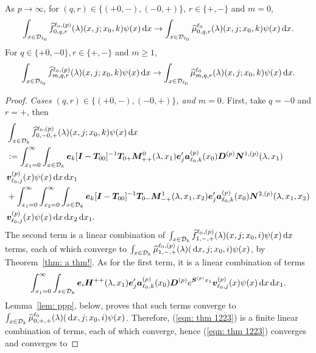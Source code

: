 \begin{thm}\label{thm: a thm2!}
	As \(p\to \infty\), for \((q,r)\in\{(+0,-),(-0,+)\},\, r\in\{+,-\}\) and \(m=0\),  
	\begin{align}\int_{x\in\mathcal{D}_{\ell_0}}\widehat f_{0,q,r}^{\ell_0,(p)}(\lambda)(x,j;x_0,k)\psi(x)\, \mathrm{d} x \to \int_{x\in\mathcal{D}_{\ell_0}}\widehat \mu_{0,q,r}^{\ell_0}(\lambda)(x,j;x_0,k)\psi(x)\, \mathrm{d} x.\end{align}
	For \(q\in\{+0,-0\}, r\in\{+,-\}\) and \(m\geq 1\), 
	\begin{align}\int_{x\in\mathcal{D}_{\ell_0}}\widehat f_{m,q,r}^{\ell_0,(p)}(\lambda)(x,j;x_0,k)\psi(x)\, \mathrm{d} x \to \int_{x\in\mathcal{D}_{\ell_0}}\widehat \mu_{m,q,r}^{\ell_0}(\lambda)(x,j;x_0,k)\psi(x)\, \mathrm{d} x.\label{eqn: thm 22}\end{align}
\end{thm}
\begin{proof}
	\textit{Cases \((q,r) \in \{(+0,-),(-0,+)\}\), and \(m=0\).} First, take \(q=-0\) and \(r=+\), then 
	\begin{align}
		&\int_{x\in\mathcal{D}_k}\widehat{f}_{0,-0,+}^{\ell_0,(p)}(\lambda)(x,j;x_0,k)\psi(x)\, \mathrm{d} x \nonumber 
		\\&:=\int_{x_1=0}^\infty \int_{x\in\mathcal{D}_k} \boldsymbol e_k [\boldsymbol I - \boldsymbol T_{00}]^{-1}\boldsymbol T_{0+} \boldsymbol M^0_{++}(\lambda,x_1)\boldsymbol e_j'{} \nonumber
		\boldsymbol a_{\ell_0,k}^{(p)}(x_0) \boldsymbol D^{(p)} \boldsymbol N^{1,(p)}(\lambda,x_1) 
		\\& {\boldsymbol v}_{\ell_0,j}^{(p)}(x)\psi(x)\, \mathrm{d} x\, \mathrm{d} x_{1}  \nonumber
		\\& + \int_{x_1=0}^\infty\int_{x_2=0}^\infty \int_{x\in\mathcal{D}_k}  \boldsymbol e_k [\boldsymbol I - \boldsymbol T_{00}]^{-1}\boldsymbol T_{0-} \boldsymbol M^1_{-+}(\lambda,x_1,x_{2})\boldsymbol e_j'{} \nonumber
		\boldsymbol a_{\ell_0,k}^{(p)}(x_0)\boldsymbol N^{2,(p)}(\lambda,x_1,x_{2}) 
		\\& {\boldsymbol v}_{\ell_0,j}^{(p)}(x)\psi(x)\, \mathrm{d} x\, \mathrm{d} x_{2} \, \mathrm{d} x_1. \label{eqn: thm 1223}
	\end{align}
	The second term is a linear combination of \(\int_{x\in\mathcal{D}_k}\widehat{f}_{1,-,+}^{\ell_0,(p)}(\lambda)(x,j;x_0,i) \psi(x)\, \mathrm{d} x\) terms, each of which converge to \(\int_{x\in\mathcal{D}_k}\widehat{\mu}_{1,-,+}^{\ell_0,(p)}(\lambda)(\, \mathrm{d} x,j;x_0,i) \psi(x)\), by Theorem~\ref{thm: a thm!}. As for the first term, it is a linear combination of terms
	\[\int_{x_1=0}^\infty \int_{x\in\mathcal{D}_k} \boldsymbol e_i \boldsymbol H^{++}(\lambda,x_1)\boldsymbol e_j'{} \nonumber
	\boldsymbol a_{\ell_0,k}^{(p)}(x_0) \boldsymbol D^{(p)} e^{\boldsymbol S^{(p)}x_1} 
	{\boldsymbol v}_{\ell_0,j}^{(p)}(x)\psi(x)\, \mathrm{d} x\, \mathrm{d} x_{1}.\]
	Lemma~\ref{lem: ppp}, below, proves that such terms converge to \(\int_{x\in\mathcal{D}_k}\widehat{\mu}_{0,+,+}^{\ell_0}(\lambda)(\, \mathrm{d} x,j;x_0,i) \psi(x)\). Therefore, (\ref{eqn: thm 1223}) is a finite linear combination of terms, each of which converge, hence (\ref{eqn: thm 1223}) converges and converges to 

\end{proof}
